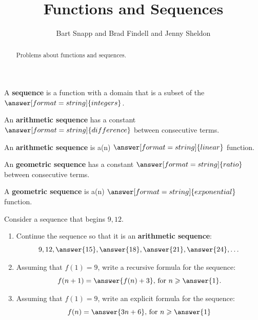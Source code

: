 \documentclass[nooutcomes]{ximera}
\title{Functions and Sequences}
\author{Bart Snapp and Brad Findell and Jenny Sheldon}
\begin{document}
\begin{abstract}
Problems about functions and sequences.
\end{abstract}
\maketitle



%
%
\begin{problem}
A \textbf{sequence} is a function with a domain that is a subset of the $\answer[format=string]{integers}$.  

An \textbf{arithmetic sequence} has a constant $\answer[format=string]{difference}$ between consecutive terms. 

An \textbf{arithmetic sequence} is a(n) $\answer[format=string]{linear}$ function. 

An \textbf{geometric sequence} has a constant $\answer[format=string]{ratio}$ between consecutive terms. 

A \textbf{geometric sequence} is a(n) $\answer[format=string]{exponential}$ function. 
\end{problem}



\begin{problem}
Consider a sequence that begins $9, 12$.    
\begin{enumerate}
\item Continue the sequence so that it is an \textbf{arithmetic sequence}:
\[
9, 12, \answer{15}, \answer{18}, \answer{21}, \answer{24}, \dots
\]
\item Assuming that $f(1)=9$, write a recursive formula for the sequence:
\[
f(n+1)=\answer{f(n)+3}\textrm{, for }n\ge\answer{1}.
\]
\item Assuming that $f(1)=9$, write an explicit formula for the sequence: 
\[
f(n)=\answer{3n+6}\textrm{, for }n\ge\answer{1}
\]
\end{enumerate}
\end{problem}
\end{document}
